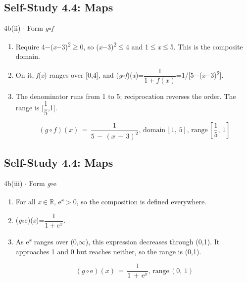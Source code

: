 \documentclass[11pt]{article}
\begin{document}
\begin{keepsection}\subsection{Self-Study 4.4: Maps}

\begin{workedbox}{4b(ii) \ensuremath{\cdot} Form \textit{g}\ensuremath{\circ}\textit{f}}
\begin{enumerate}
\item Require 4\ensuremath{-}(\textit{x}\ensuremath{-}3)\textsuperscript{2}\ensuremath{\geq}0, so (\textit{x}\ensuremath{-}3)\textsuperscript{2}\ensuremath{\leq}4 and 1\ensuremath{\leq}\textit{x}\ensuremath{\leq}5. This is the composite domain.
\item On it, \textit{f}(\textit{x}) ranges over [0,4], and (\textit{g}\ensuremath{\circ}\textit{f})(\textit{x})={\small\ensuremath{\dfrac{1}{1+{f}({x})}}}=1/[5\ensuremath{-}(\textit{x}\ensuremath{-}3)\textsuperscript{2}].
\item {}
The denominator runs from 1 to 5; reciprocation reverses the order. The range is [{\small\ensuremath{\dfrac{1}{5}}},1].

\begin{equation*}({g}\circ {f})({x})\, =\, \dfrac{1}{5\, -\, ({x}\, -\, 3)^{2}},\, \text{domain}\, [1,\, 5],\, \text{range}\, \left[\dfrac{1}{5},\, 1\right]\end{equation*}
\end{enumerate}
\end{workedbox}

\end{keepsection}
\begin{keepsection}\subsection{Self-Study 4.4: Maps}

\begin{workedbox}{4b(iii) \ensuremath{\cdot} Form \textit{g}\ensuremath{\circ}e}
\begin{enumerate}
\item For all \textit{x}\ensuremath{\in}\ensuremath{\mathbb{R}}, e\textsuperscript{\textit{x}}\ensuremath{>}0, so the composition is defined everywhere.
\item (\textit{g}\ensuremath{\circ}e)(\textit{x})={\small\ensuremath{\dfrac{1}{1+\mathrm{e}^{{x}}}}}.
\item {}
As e\textsuperscript{\textit{x}} ranges over (0,\ensuremath{\infty}), this expression decreases through (0,1). It approaches 1 and 0 but reaches neither, so the range is (0,1).

\begin{equation*}({g}\circ \mathrm{e})({x})\, =\, \dfrac{1}{1\, +\, \mathrm{e}^{{x}}},\, \text{range}\, (0,\, 1)\end{equation*}
\end{enumerate}
\end{workedbox}

\end{keepsection}
\end{document}
